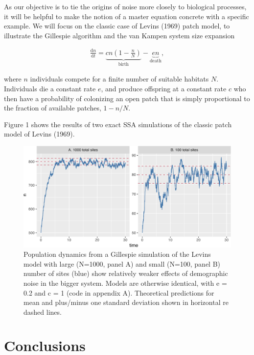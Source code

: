 \documentclass[3p]{elsarticle} %
\makeatletter
\def\maxwidth{\ifdim\Gin@nat@width>\linewidth\linewidth
\else\Gin@nat@width\fi}
\let\Oldincludegraphics\includegraphics
\renewcommand{\includegraphics}[1]{\Oldincludegraphics[width=\maxwidth]{#1}}
\makeatother
\begin{document}
As our objective is to tie the origins of noise more closely to
biological processes, it will be helpful to make the notion of a master
equation concrete with a specific example. We will focus on the classic
case of Levins (1969) patch model, to illustrate the Gillespie algorithm
and the van Kampen system size expansion

\begin{align}
\frac{\mathrm{d} n}{\mathrm{d} t} = \underbrace{c n \left(1 - \frac{n}{N}\right)}_{\textrm{birth}} - \underbrace{e n}_{\textrm{death}}, \label{levins}
\end{align}

where \(n\) individuals compete for a finite number of suitable habitats
\(N\). Individuals die a constant rate \(e\), and produce offspring at a
constant rate \(c\) who then have a probability of colonizing an open
patch that is simply proportional to the fraction of available patches,
\(1 - n/N\).

Figure 1 shows the results of two exact SSA simulations of the classic
patch model of Levins (1969).

\begin{figure}
\centering
\includegraphics{paper_files/figure-latex/figure1-1.pdf}
\caption{Population dynamics from a Gillespie simulation of the Levins
model with large (N=1000, panel A) and small (N=100, panel B) number of
sites (blue) show relatively weaker effects of demographic noise in the
bigger system. Models are otherwise identical, with e = 0.2 and c = 1
(code in appendix A). Theoretical predictions for mean and plus/minus
one standard deviation shown in horizontal re dashed lines.}
\end{figure}

\hypertarget{conclusions}{%
\section{Conclusions}\label{conclusions}}
\end{document}
